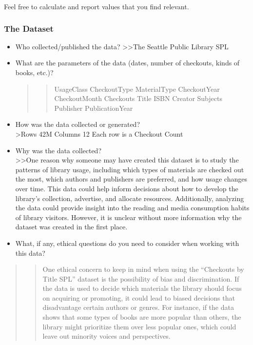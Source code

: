 \documentclass[
]{article}
\begin{document}
Feel free to calculate and report values that you find relevant.

\hypertarget{the-dataset}{%
\subsubsection{The Dataset}\label{the-dataset}}

\begin{itemize}
\item
  Who collected/published the data? \textgreater\textgreater The Seattle
  Public Library SPL
\item
  What are the parameters of the data (dates, number of checkouts, kinds
  of books, etc.)?

  \begin{quote}
  \begin{quote}
  UsageClass CheckoutType MaterialType CheckoutYear CheckoutMonth
  Checkouts Title ISBN Creator Subjects Publisher PublicationYear
  \end{quote}
  \end{quote}
\item
  How was the data collected or generated?\\
  \textgreater Rows 42M Columns 12 Each row is a Checkout Count
\item
  Why was the data collected?\\
  \textgreater\textgreater One reason why someone may have created this
  dataset is to study the patterns of library usage, including which
  types of materials are checked out the most, which authors and
  publishers are preferred, and how usage changes over time. This data
  could help inform decisions about how to develop the library's
  collection, advertise, and allocate resources. Additionally, analyzing
  the data could provide insight into the reading and media consumption
  habits of library visitors. However, it is unclear without more
  information why the dataset was created in the first place.
\item
  What, if any, ethical questions do you need to consider when working
  with this data?
\end{itemize}

\begin{quote}
\begin{quote}
One ethical concern to keep in mind when using the ``Checkouts by Title
SPL'' dataset is the possibility of bias and discrimination. If the data
is used to decide which materials the library should focus on acquiring
or promoting, it could lead to biased decisions that disadvantage
certain authors or genres. For instance, if the data shows that some
types of books are more popular than others, the library might
prioritize them over less popular ones, which could leave out minority
voices and perspectives.
\end{quote}
\end{quote}
\end{document}
